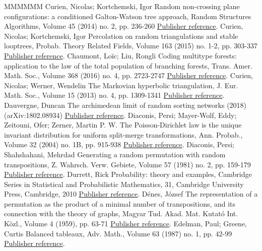 \documentclass[11pt]{article}
\theoremstyle{definition}
\numberwithin{equation}{section}
\numberwithin{figure}{section}
\numberwithin{table}{section}
\begin{document}
\begin{thebibliography}{MMMMMM}
 Curien, Nicolas; Kortchemski, Igor Random non-crossing plane configurations: a conditioned Galton-Watson tree approach, Random Structures Algorithms, Volume 45 (2014) no. 2, pp. 236-260 \href{https://ahl.centre-mersenne.org/item/AHL_2018__1__149_0/#CK14}{Publisher reference}.
 Curien, Nicolas; Kortchemski, Igor Percolation on random triangulations and stable looptrees, Probab. Theory Related Fields, Volume 163 (2015) no. 1-2, pp. 303-337 \href{https://ahl.centre-mersenne.org/item/AHL_2018__1__149_0/#CK15}{Publisher reference}.
 Chaumont, Loïc; Liu, Rongli Coding multitype forests: application to the law of the total population of branching forests, Trans. Amer. Math. Soc., Volume 368 (2016) no. 4, pp. 2723-2747 \href{https://ahl.centre-mersenne.org/item/AHL_2018__1__149_0/#CL16}{Publisher reference}.
 Curien, Nicolas; Werner, Wendelin The Markovian hyperbolic triangulation, J. Eur. Math. Soc., Volume 15 (2013) no. 4, pp. 1309-1341 \href{https://ahl.centre-mersenne.org/item/AHL_2018__1__149_0/#CWmht}{Publisher reference}.
 Dauvergne, Duncan The archimedean limit of random sorting networks (2018) (arXiv:1802.08934) \href{https://ahl.centre-mersenne.org/item/AHL_2018__1__149_0/#dauvergne2018archimedean}{Publisher reference}.
 Diaconis, Persi; Mayer-Wolf, Eddy; Zeitouni, Ofer; Zerner, Martin P. W. The Poisson-Dirichlet law is the unique invariant distribution for uniform split-merge transformations, Ann. Probab., Volume 32 (2004) no. 1B, pp. 915-938 \href{https://ahl.centre-mersenne.org/item/AHL_2018__1__149_0/#DMZZ04}{Publisher reference}.
 Diaconis, Persi; Shahshahani, Mehrdad Generating a random permutation with random transpositions, Z. Wahrsch. Verw. Gebiete, Volume 57 (1981) no. 2, pp. 159-179 \href{https://ahl.centre-mersenne.org/item/AHL_2018__1__149_0/#DS81}{Publisher reference}.
 Durrett, Rick Probability: theory and examples, Cambridge Series in Statistical and Probabilistic Mathematics, 31, Cambridge University Press, Cambridge, 2010 \href{https://ahl.centre-mersenne.org/item/AHL_2018__1__149_0/#Dur10}{Publisher reference}.
 Dénes, József The representation of a permutation as the product of a minimal number of transpositions, and its connection with the theory of graphs, Magyar Tud. Akad. Mat. Kutató Int. Közl., Volume 4 (1959), pp. 63-71 \href{https://ahl.centre-mersenne.org/item/AHL_2018__1__149_0/#Den59}{Publisher reference}.
 Edelman, Paul; Greene, Curtis Balanced tableaux, Adv. Math., Volume 63 (1987) no. 1, pp. 42-99 \href{https://ahl.centre-mersenne.org/item/AHL_2018__1__149_0/#EG87}{Publisher reference}.

\end{thebibliography}
\end{document}
